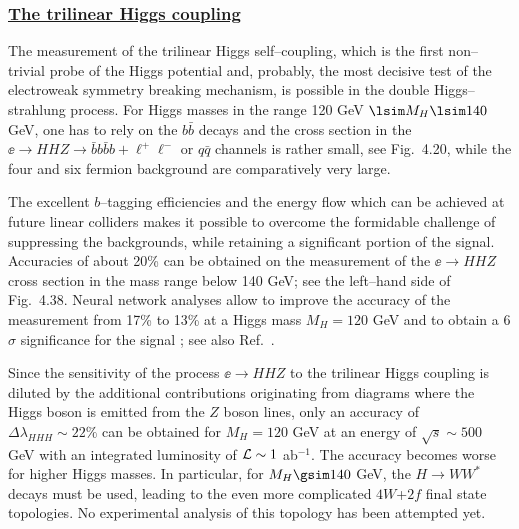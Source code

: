 \subsubsection*{\underline{The trilinear Higgs coupling}}

The measurement of the trilinear Higgs self--coupling, which  is the
first non--trivial probe of the Higgs potential and, probably, the most decisive
test of the electroweak symmetry breaking mechanism, is possible in the double
Higgs--strahlung process. For Higgs masses in the range 120 GeV $\lsim M_H 
\lsim 140$ GeV, one has to rely on the $b\bar b$ decays and the cross section 
in the $\ee \to HHZ \to \bar{b}b \bar{b}b+\ell^+ \ell^-$ or $q\bar{q}$ 
channels is rather small, see Fig.~4.20, while the four and six fermion 
background are comparatively very large. \s

The excellent $b$--tagging efficiencies and the energy flow which can be
achieved at future linear colliders makes it possible to overcome the
formidable challenge of suppressing the backgrounds, while retaining a
significant portion of the signal.  Accuracies of about 20\% can be obtained
on the measurement of the $\ee \to HHZ$ cross section in the mass range below 
140 GeV; see the left--hand side of Fig.~4.38. Neural network analyses allow 
to improve the accuracy of the measurement from 17\% to 13\% at a Higgs mass 
$M_H=120$ GeV and to obtain a 6$\sigma$ significance for the signal
\cite{Clermont-Ferrand}; see also Ref.~\cite{HHH-baur}. \s

Since the sensitivity of the process $\ee \to HHZ$ to the trilinear Higgs 
coupling is diluted by the additional contributions originating from diagrams 
where the Higgs boson is emitted from the $Z$ boson lines, only an accuracy of 
$\Delta \lambda_{HHH} \sim 22\%$  can be obtained for $M_H=120$ GeV at an 
energy of  $\sqrt{s}\sim 500$ GeV with an integrated luminosity of
${\cal L} \sim 1$  ab$^{-1}$. The accuracy becomes worse for higher Higgs 
masses. In particular, for $M_H \gsim 140$ GeV, the $H\to WW^*$ decays must 
be used, leading to the even more complicated $4W$+$2f$ final state topologies.
No experimental analysis of this topology has been attempted yet.\s

